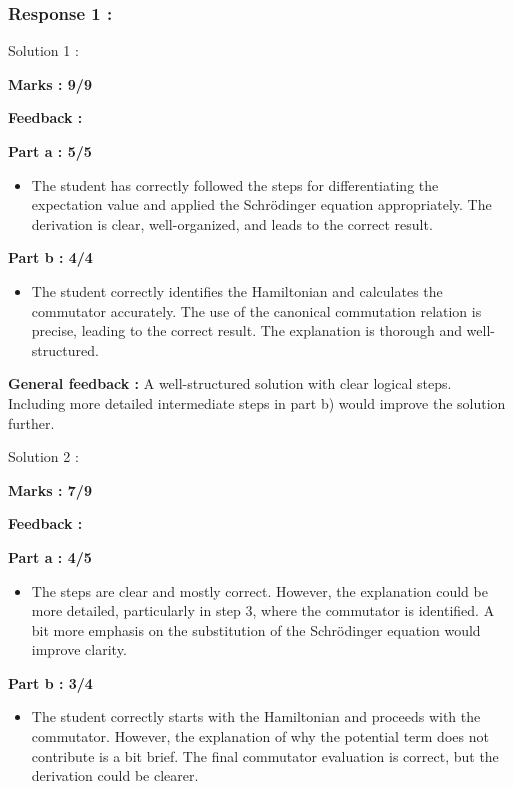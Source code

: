\documentclass[a4paper,11pt]{article}
\begin{document}
\subsubsection*{Response 1 :}

Solution 1 :

\textbf{Marks : 9/9}

\textbf{Feedback :}

\textbf{Part a : 5/5}

\begin{itemize}
    \item The student has correctly followed the steps for differentiating the expectation value and applied the Schrödinger equation appropriately. The derivation is clear, well-organized, and leads to the correct result.
\end{itemize}

\textbf{Part b : 4/4}

\begin{itemize}
    \item The student correctly identifies the Hamiltonian and calculates the commutator accurately. The use of the canonical commutation relation is precise, leading to the correct result. The explanation is thorough and well-structured.
\end{itemize}

\textbf{General feedback :}
A well-structured solution with clear logical steps. Including more detailed intermediate steps in part b) would improve the solution further.


Solution 2 :

\textbf{Marks : 7/9}

\textbf{Feedback :}

\textbf{Part a : 4/5}

\begin{itemize}
    \item The steps are clear and mostly correct. However, the explanation could be more detailed, particularly in step 3, where the commutator is identified. A bit more emphasis on the substitution of the Schrödinger equation would improve clarity.
\end{itemize}

\textbf{Part b : 3/4}

\begin{itemize}
    \item The student correctly starts with the Hamiltonian and proceeds with the commutator. However, the explanation of why the potential term does not contribute is a bit brief. The final commutator evaluation is correct, but the derivation could be clearer.
\end{itemize}
\end{document}

